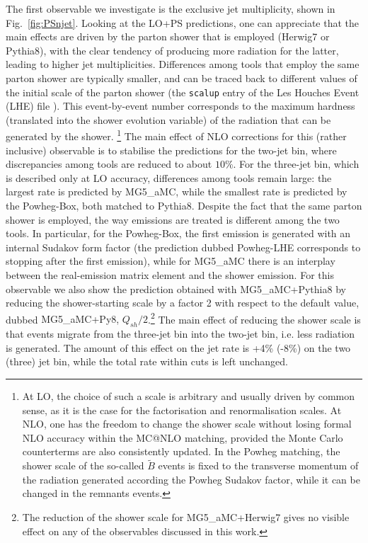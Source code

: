 \documentclass[twocolumn,epjc3]{svjour3} %
\begin{document}
The first observable we investigate is the exclusive jet multiplicity, shown in Fig.~\ref{fig:PSnjet}. Looking at the LO+PS predictions, one can appreciate that the
main effects are driven by the parton shower that is employed ({\sc Herwig7} or {\sc Pythia8}), with the clear tendency of producing more radiation for the latter,
leading to higher jet multiplicities. Differences among tools that employ the same parton shower are typically smaller, and can be traced back to different values of the
initial scale of the parton shower (the {\tt scalup} entry of the Les Houches Event (LHE) file \cite{Alwall:2006yp,Butterworth:2010ym}). This event-by-event number corresponds
to the maximum hardness (translated into the shower evolution variable) of the radiation that
can be generated by the shower. \footnote{At LO, the choice of such a scale is arbitrary and usually driven by common sense,
as it is the case for the factorisation and renormalisation scales.
    At NLO, one has the freedom to change the shower scale without losing formal NLO accuracy within the {\sc MC@NLO} matching,
    provided the Monte Carlo counterterms are also consistently
updated. In the {\sc Powheg} matching, the shower scale of the so-called $\tilde B$ events is fixed to the transverse momentum of the radiation
generated according the {\sc Powheg} Sudakov factor, while it can be changed in the remnants events.}
The main effect of NLO corrections for this (rather inclusive) observable is to stabilise the predictions for the two-jet bin, where discrepancies
among tools are reduced to about $10\%$. For the three-jet bin, which is described only at LO accuracy, differences among tools remain large: the largest rate is predicted by
{\sc MG5\_aMC}, while the smallest rate is predicted by the {\sc Powheg-Box}, both matched to {\sc Pythia8}. Despite the fact that the same parton shower is employed, the way emissions are treated
is different among the two tools. In particular, for the {\sc Powheg-Box}, the first emission is generated with an internal Sudakov form factor (the
prediction dubbed {\sc Powheg-LHE} corresponds to stopping after the first emission), while for {\sc MG5\_aMC} there is an
interplay between the real-emission matrix element and the shower emission. For this observable we also show the prediction obtained
with {\sc MG5\_aMC+Pythia8} by reducing the shower-starting scale by a factor 2 with respect to the default value, dubbed 
{\sc MG5\_aMC+Py8, $Q_{sh}/2$}.\footnote{The reduction of the shower scale for {\sc MG5\_aMC+Herwig7} gives no visible effect on any of the observables 
discussed in this work.} The main effect of reducing the shower scale is that events migrate from the three-jet bin into the two-jet bin, i.e. less radiation is generated. The
amount of this effect on the jet rate is +4\% (-8\%) on the two (three) jet bin, while the total rate within cuts is left unchanged.  
\end{document}
